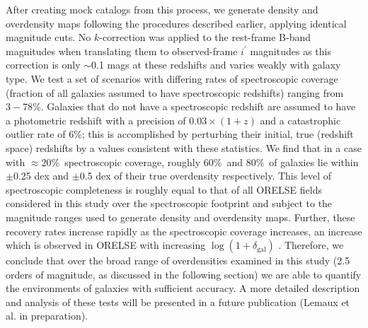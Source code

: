 \documentclass[a4paper,fleqn,usenatbib]{mnras}
\begin{document}
After creating mock catalogs from this process, we generate density and overdensity maps following the procedures described earlier, applying identical magnitude cuts.
No $k$-correction was applied to the rest-frame B-band magnitudes when translating them to observed-frame $i^{\prime}$ magnitudes as this correction is only $\sim$0.1 mags at these redshifts and varies weakly with galaxy type.
We test a set of scenarios with differing rates of spectroscopic coverage (fraction of all galaxies assumed to have spectroscopic redshifts) ranging from $3-78$\%.
Galaxies that do not have a spectroscopic redshift are assumed to have a photometric redshift with a precision of $0.03 \times (1+z)$ and a catastrophic outlier rate of 6\%; this is accomplished by perturbing their initial, true (redshift space) redshifts by a values consistent with these statistics.
We find that in a case with $\approx$20\%\ spectroscopic coverage, roughly 60\%\ and 80\%\ of galaxies lie within $\pm$0.25 dex  and $\pm$0.5 dex of their true overdensity respectively.
This level of spectroscopic completeness is roughly equal to that of all ORELSE fields considered in this study over the spectroscopic footprint and subject to the magnitude ranges used to generate density and overdensity maps.
Further, these recovery rates increase rapidly as the spectroscopic coverage increases, an increase which is observed in ORELSE with increasing $\log(1+\delta_{\mathrm{gal}})$ \citep[see][]{Lemaux2016arxiv, Shen2017arxiv}.
Therefore, we conclude that over the broad range of overdensities examined in this study (2.5 orders of magnitude, as discussed in the following section) we are able to quantify the environments of galaxies with sufficient accuracy.
A more detailed description and analysis of these tests will be presented in a future publication (Lemaux et al. in preparation).
\end{document}
